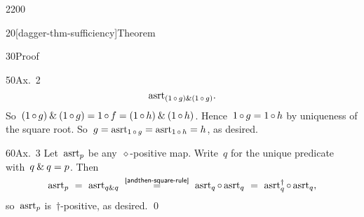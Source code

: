 \begin{parsec}{2200}
\begin{point}{20}[dagger-thm-sufficiency]{Theorem}
\begin{point}{30}{Proof}
\begin{point}{50}{Ax.~2}
\begin{equation*}
            \mathrm{asrt}_{(1 \mathop{\circ} g) \mathbin{\&} (1 \mathop{\circ} g)}.
\end{equation*}
So~$(1 \mathop{\circ} g) \mathbin{\&} (1\mathop{\circ} g) = 1\mathop{\circ} f =
            (1 \mathop{\circ} h) \mathbin{\&} (1 \mathop{\circ} h)$.
Hence~$1\mathop{\circ} g = 1 \mathop{\circ} h$ by uniqueness of the square root.
So~$g = \mathrm{asrt}_{1 \mathop{\circ} g} = \mathrm{asrt}_{1 \mathop{\circ} h} = h$, as desired.
\end{point}
\begin{point}{60}{Ax.~3}%
Let~$\mathrm{asrt}_p$ be any~$\diamond$-positive map.
Write~$q$ for the unique predicate with~$q \mathbin{\&} q=p$.
Then
\begin{equation*}
    \asrt_p
     \ = \ \asrt_{\andthen{q}{q}}
            \ \overset{\smash{\sref{andthen-square-rule}}}{=}\ 
     \asrt_q \after \asrt_q  \ =\ 
     \asrt_q^\dagger \after \asrt_q ,
\end{equation*}
so~$\mathrm{asrt}_p$ is~$\dagger$-positive, as desired. \qed
\end{point}
\end{point}
\end{point}
\end{parsec}

